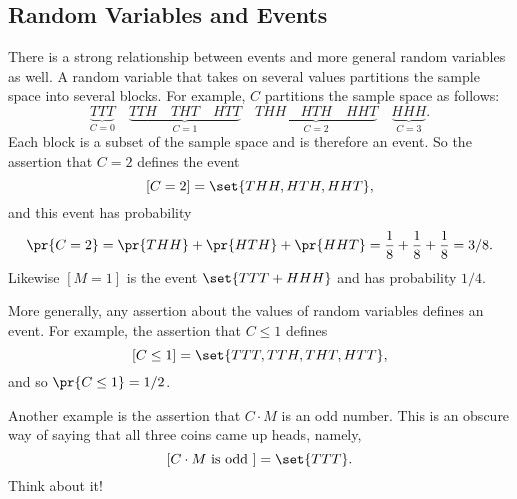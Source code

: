 \subsection{Random Variables and Events}

There is a strong relationship between events and more general random
variables as well.  A random variable that takes on several values
partitions the sample space into several blocks.  For example, $C$
partitions the sample space as follows:
\[
\underbrace{TTT}_{\text{$C = 0$}} \quad
\underbrace{TTH \quad THT \quad HTT}_{\text{$C = 1$}} \quad
\underbrace{THH \quad HTH \quad HHT}_{\text{$C = 2$}} \quad
\underbrace{HHH}_{\text{$C = 3$}}.
\]
Each block is a subset of the sample space and is therefore an event.
So the assertion that $C = 2$ defines the event
\[
[C = 2] = \set{THH, HTH, HHT},
\]
and this event has probability
\[
\pr{C = 2} = \pr{THH} + \pr{HTH} +\pr{HHT} = \frac{1}{8} + \frac{1}{8} +\frac{1}{8} =3/8.
\]
Likewise $[M = 1]$ is the event $\set{TTT + HHH}$ and has probability
$1/4$.

\iffalse
As another example:
\[
\pr{M = 1} =  \pr{TTT} + \pr{HHH} =  \frac{1}{8} + \frac{1}{8} =  \frac{1}{4}\,.
\]
\fi

More generally, any assertion about the values of random variables
defines an event.  For example, the assertion that $C \leq 1$ defines
\[
[C \leq 1] = \set{TTT, TTH, THT, HTT},
\]
and so $\pr{C \leq 1}= 1/2$.

Another example is the assertion that $C \cdot M$ is an odd number.
This is an obscure way of saying that all three coins came up heads,
namely,
\[
[C \cdot M \text{ is odd }] = \set{TTT}.
\]
Think about it!

\iffalse

Naturally enough, we can talk about the probability of events defined
by properties of random variables.  For example,
\[
\pr{C = 2}  =  \pr{THH} + \pr{HTH} + \pr{HHT}  =  \frac{1}{8} +
\frac{1}{8} + \frac{1}{8} =  \frac{3}{8}.
\]

\begin{eqnarray*}
\pr{C = 2}
        & = &   \pr{THH} + \pr{HTH} + \pr{HHT} \\
        & = &   \frac{1}{8} + \frac{1}{8} + \frac{1}{8} =  \frac{3}{8}\,.
\end{eqnarray*}

As another example:
\[
\pr{M = 1} =  \pr{TTT} + \pr{HHH} =  \frac{1}{8} + \frac{1}{8} =  \frac{1}{4}\,.
\]


\begin{eqnarray*}
\pr{M = 1}
        & = &   \pr{TTT} + \pr{HHH}\\
        & = &   \frac{1}{8} + \frac{1}{8} =  \frac{1}{4}.
\end{eqnarray*}
\fi

